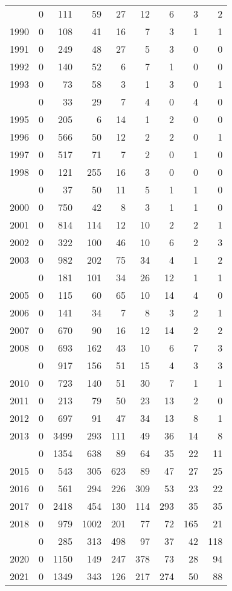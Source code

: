 \documentclass[
]{article}
\begin{document}
\begin{longtable}[t]{lrrrrrrrr}
\endfoot
\bottomrule
\endlastfoot
1989 & 0 & 111 & 59 & 27 & 12 & 6 & 3 & 2\\
1990 & 0 & 108 & 41 & 16 & 7 & 3 & 1 & 1\\
1991 & 0 & 249 & 48 & 27 & 5 & 3 & 0 & 0\\
1992 & 0 & 140 & 52 & 6 & 7 & 1 & 0 & 0\\
1993 & 0 & 73 & 58 & 3 & 1 & 3 & 0 & 1\\
\addlinespace
1994 & 0 & 33 & 29 & 7 & 4 & 0 & 4 & 0\\
1995 & 0 & 205 & 6 & 14 & 1 & 2 & 0 & 0\\
1996 & 0 & 566 & 50 & 12 & 2 & 2 & 0 & 1\\
1997 & 0 & 517 & 71 & 7 & 2 & 0 & 1 & 0\\
1998 & 0 & 121 & 255 & 16 & 3 & 0 & 0 & 0\\
\addlinespace
1999 & 0 & 37 & 50 & 11 & 5 & 1 & 1 & 0\\
2000 & 0 & 750 & 42 & 8 & 3 & 1 & 1 & 0\\
2001 & 0 & 814 & 114 & 12 & 10 & 2 & 2 & 1\\
2002 & 0 & 322 & 100 & 46 & 10 & 6 & 2 & 3\\
2003 & 0 & 982 & 202 & 75 & 34 & 4 & 1 & 2\\
\addlinespace
2004 & 0 & 181 & 101 & 34 & 26 & 12 & 1 & 1\\
2005 & 0 & 115 & 60 & 65 & 10 & 14 & 4 & 0\\
2006 & 0 & 141 & 34 & 7 & 8 & 3 & 2 & 1\\
2007 & 0 & 670 & 90 & 16 & 12 & 14 & 2 & 2\\
2008 & 0 & 693 & 162 & 43 & 10 & 6 & 7 & 3\\
\addlinespace
2009 & 0 & 917 & 156 & 51 & 15 & 4 & 3 & 3\\
2010 & 0 & 723 & 140 & 51 & 30 & 7 & 1 & 1\\
2011 & 0 & 213 & 79 & 50 & 23 & 13 & 2 & 0\\
2012 & 0 & 697 & 91 & 47 & 34 & 13 & 8 & 1\\
2013 & 0 & 3499 & 293 & 111 & 49 & 36 & 14 & 8\\
\addlinespace
2014 & 0 & 1354 & 638 & 89 & 64 & 35 & 22 & 11\\
2015 & 0 & 543 & 305 & 623 & 89 & 47 & 27 & 25\\
2016 & 0 & 561 & 294 & 226 & 309 & 53 & 23 & 22\\
2017 & 0 & 2418 & 454 & 130 & 114 & 293 & 35 & 35\\
2018 & 0 & 979 & 1002 & 201 & 77 & 72 & 165 & 21\\
\addlinespace
2019 & 0 & 285 & 313 & 498 & 97 & 37 & 42 & 118\\
2020 & 0 & 1150 & 149 & 247 & 378 & 73 & 28 & 94\\
2021 & 0 & 1349 & 343 & 126 & 217 & 274 & 50 & 88\\*
\end{longtable}
\end{document}

